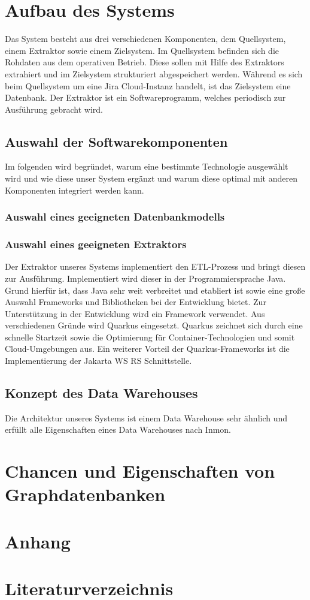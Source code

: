 \documentclass{article}
\begin{document}
\section{Aufbau des Systems}
Das System besteht aus drei verschiedenen Komponenten, dem Quellsystem, einem Extraktor sowie einem Zielsystem. Im Quellsystem befinden sich die Rohdaten aus dem operativen Betrieb. Diese sollen mit Hilfe des Extraktors extrahiert und im Zielsystem strukturiert abgespeichert werden. Während es sich beim Quellsystem um eine Jira Cloud-Instanz handelt, ist das Zielsystem eine Datenbank. Der Extraktor ist ein Softwareprogramm, welches periodisch zur Ausführung gebracht wird.
\subsection{Auswahl der Softwarekomponenten}
Im folgenden wird begründet, warum eine bestimmte Technologie ausgewählt wird und wie diese unser System ergänzt und warum diese optimal mit anderen Komponenten integriert werden kann.
\subsubsection{Auswahl eines geeigneten Datenbankmodells}
\subsubsection{Auswahl eines geeigneten Extraktors}
Der Extraktor unseres Systems implementiert den ETL-Prozess und bringt diesen zur Ausführung. Implementiert wird dieser in der Programmiersprache Java. Grund hierfür ist, dass Java sehr weit verbreitet und etabliert ist sowie eine große Auswahl Frameworks und Bibliotheken bei der Entwicklung bietet. Zur Unterstützung in der Entwicklung wird ein Framework verwendet. Aus verschiedenen Gründe wird Quarkus eingesetzt. Quarkus zeichnet sich durch eine schnelle Startzeit sowie die Optimierung für Container-Technologien und somit Cloud-Umgebungen aus. Ein weiterer Vorteil der Quarkus-Frameworks ist die Implementierung der Jakarta WS RS Schnittstelle.
\subsection{Konzept des Data Warehouses}
Die Architektur unseres Systems ist einem Data Warehouse sehr ähnlich und erfüllt alle Eigenschaften eines Data Warehouses nach Inmon.
\section{Chancen und Eigenschaften von Graphdatenbanken}
\newpage
\section{Anhang}
\newpage
\section{Literaturverzeichnis}
\end{document}
